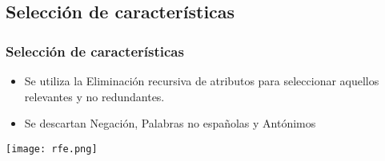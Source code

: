 \subsection{Selección de características}
\begin{frame}[allowframebreaks]
    \frametitle{Selección de características}

    \begin{itemize}
        \item Se utiliza la Eliminación recursiva de atributos para seleccionar aquellos relevantes y no redundantes.
        \item Se descartan Negación, Palabras no españolas y Antónimos
    \end{itemize}

    \begin{center}
        \texttt{[image: rfe.png]}
    \end{center}
\end{frame}

